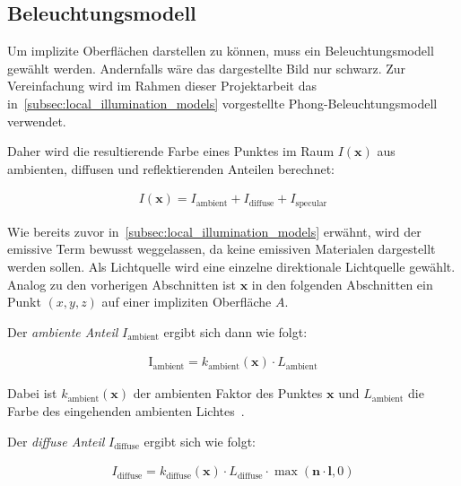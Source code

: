 
\subsection{Beleuchtungsmodell}
\label{sec:rendering_implicit_surfaces_lighting}

Um implizite Oberflächen darstellen zu können, muss ein
Beleuchtungsmodell gewählt werden. Andernfalls wäre  das dargestellte
Bild nur schwarz. Zur Vereinfachung wird im Rahmen dieser Projektarbeit
das in~\autoref{subsec:local_illumination_models} vorgestellte
Phong-Beleuchtungsmodell verwendet.

Daher wird die resultierende Farbe eines Punktes im Raum $I(\bm{x})$ aus
ambienten, diffusen und reflektierenden Anteilen berechnet:

\begin{gather}
    I(\bm{x}) = I_{\text{ambient}} + I_{\text{diffuse}} + I_{\text{specular}}
\end{gather}

Wie bereits zuvor in~\autoref{subsec:local_illumination_models} erwähnt,
wird der emissive Term bewusst weggelassen, da keine emissiven Materialen
dargestellt werden sollen. Als Lichtquelle wird eine einzelne direktionale
Lichtquelle gewählt. Analog zu den vorherigen Abschnitten ist $\bm{x}$
in den folgenden Abschnitten ein Punkt $(x, y, z)$ auf einer impliziten
Oberfläche $A$.

Der \textit{ambiente Anteil} $I_{\text{ambient}}$ ergibt sich dann wie
folgt:

\begin{gather}
    \text{I}_{\text{ambient}} = k_{\text{ambient}}(\bm{x}) \cdot L_{\text{ambient}}
\end{gather}

Dabei ist $k_{\text{ambient}}(\bm{x})$ der ambienten Faktor des
Punktes $\bm{x}$ und $L_{\text{ambient}}$ die Farbe des eingehenden ambienten
Lichtes~\parencites[S. 723]{glassner_introduction_1989}[Kapitel 5, Abschnitt 5.2.1]{fernando_cg_2003}.

Der \textit{diffuse Anteil} $I_{\text{diffuse}}$ ergibt sich wie folgt:

\begin{gather}
    I_{\text{diffuse}} = k_{\text{diffuse}}(\bm{x}) \cdot L_{\text{diffuse}} \cdot \max(\bm{n} \cdot \bm{l}, 0)
\end{gather}

